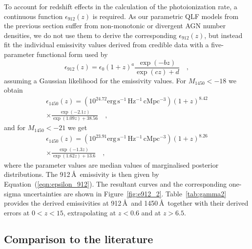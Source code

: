 \documentclass[fleqn,usenatbib]{mnras}
\begin{document}
To account for redshift effects in the calculation of the 
photoionization rate, a continuous function
$\epsilon_{912}\left(z\right)$ is required. As our parametric QLF
models from the previous section suffer from non-monotonic or
divergent AGN number densities, we do not use them to derive the
corresponding $\epsilon_{912}\left(z\right)$, but instead fit the
individual emissivity values derived from credible data with a
five-parameter functional form used by \citet{2012ApJ...746..125H}
\begin{equation}
  \epsilon_{912}\left(z\right)=\epsilon_0(1+z)^a\frac{\exp(-bz)}{\exp(cz)+d}\quad,
  \label{eqn:e912fit}
\end{equation}
assuming a Gaussian likelihood for the emissivity values.  For
$M_{1450}<-18$ we obtain
\begin{multline}
  \epsilon_{1450}\left(z\right)=\left(10^{24.72}\mathrm{erg\, s^{-1}\, Hz^{-1}\, cMpc^{-3}}\right)\left(1+z\right)^{8.42}\\\times\frac{\exp(-2.1z)}{\exp(1.09z)+38.56}\quad,
  \label{eqn:e912_18}
\end{multline}
 and for $M_{1450}<-21$ we get
 \begin{multline}
  \epsilon_{1450}\left(z\right)=\left(10^{23.91}\mathrm{erg\, s^{-1}\, Hz^{-1}\, cMpc^{-3}}\right)\left(1+z\right)^{8.26}\\\times\frac{\exp(-1.3z)}{\exp(1.62z)+13.6}\quad,
  \label{eqn:e912_21}
\end{multline}
where the parameter values are median values of marginalised posterior
distributions.  The 912\,\AA\ emissivity is then given by
Equation~(\ref{eqn:epsilon_912}).  The resultant curves and the
corresponding one-sigma uncertainties are shown in
Figure~\ref{fig:e912_2}.  Table~\ref{tab:gamma2} provides the derived
emissivities at 912\,\AA\ and 1450\,\AA\ together with their derived
errors at $0<z<15$, extrapolating at $z<0.6$ and at $z>6.5$.

\subsection{Comparison to the literature}
\end{document}
